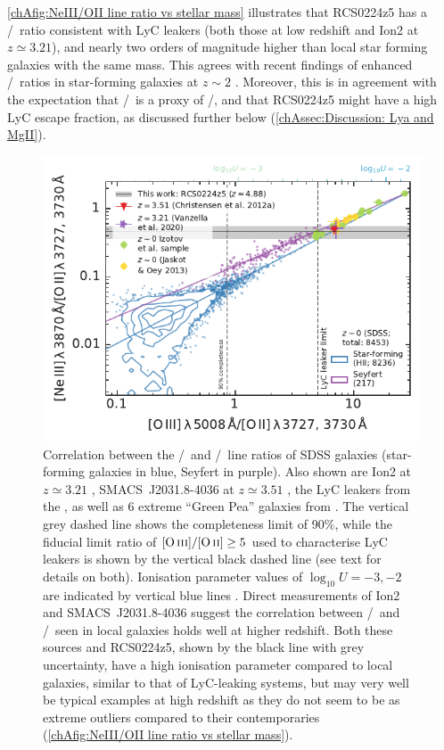 \cref{chAfig:NeIII/OII line ratio vs stellar mass} illustrates that RCS0224z5 has a \NeIII/\OII\ ratio consistent with LyC leakers (both those at low redshift and Ion2 at $z \simeq 3.21$), and nearly two orders of magnitude higher than local star forming galaxies with the same mass. This agrees with recent findings of enhanced \NeIII/\OII\ ratios in star-forming galaxies at $z \sim 2$ \citep{2015ApJ...798...29Z, 2020ApJ...902L..16J}. Moreover, this is in agreement with the expectation that \NeIII/\OII\ is a proxy of \OIIIf/\OII, and that RCS0224z5 might have a high LyC escape fraction, as discussed further below (\cref{chAssec:Discussion: Lya and MgII}).
\begin{figure}[t]
    \centering
    \includegraphics[width=0.6\linewidth]{"Plots/ChapterA/SDSS_NeIII-OII_vs_OIII-OII_DR7"}
    \caption[Correlation between the \NeIII/\OII\ and \OIIIf/\OII\ line ratios of SDSS galaxies]{Correlation between the \NeIII/\OII\ and \OIIIf/\OII\ line ratios of SDSS galaxies (star-forming galaxies in blue, Seyfert in purple). Also shown are Ion2 at $z \simeq 3.21$ \citep{2020MNRAS.491.1093V}, SMACS~J2031.8-4036 at $z \simeq 3.51$ \citep{2012MNRAS.427.1953C}, the LyC leakers from the \Isample, as well as $6$ extreme ``Green Pea'' galaxies from \citet{2013ApJ...766...91J}. The vertical grey dashed line shows the completeness limit of 90\%, while the fiducial limit ratio of $\OIIIf/\OII \geq 5$ used to characterise LyC leakers is shown by the vertical black dashed line (see text for details on both). Ionisation parameter values of $\log_{10} U = -3, -2$ are indicated by vertical blue lines \citep[see \cref{chAeq:OIII/OII logU diagnostic}, derived by][]{2000MNRAS.318..462D}. Direct measurements of Ion2 and SMACS~J2031.8-4036 suggest the correlation between \NeIII/\OII\ and \OIIIf/\OII\ seen in local galaxies holds well at higher redshift. Both these sources and RCS0224z5, shown by the black line with grey uncertainty, have a high ionisation parameter compared to local galaxies, similar to that of LyC-leaking systems, but may very well be typical examples at high redshift as they do not seem to be as extreme outliers compared to their contemporaries (\cref{chAfig:NeIII/OII line ratio vs stellar mass}).}
    \label{chAfig:NeIII/OII vs OIII/OII line ratios}
\end{figure}

